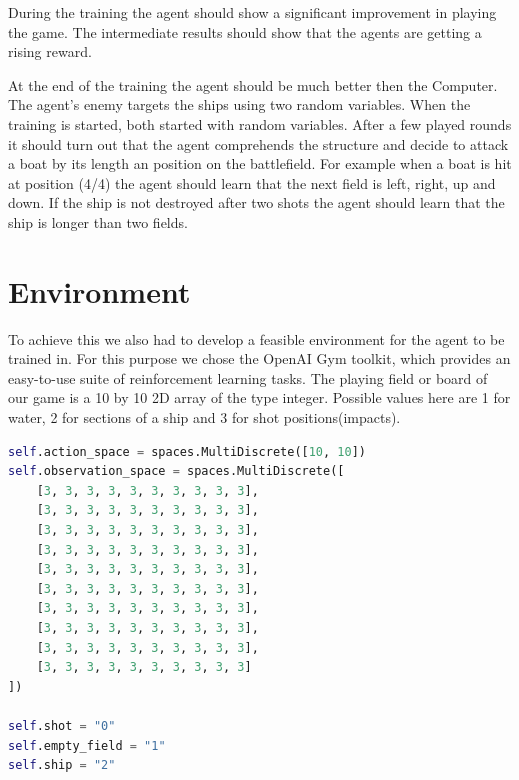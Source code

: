 \documentclass[sigconf]{acmart}
\begin{document}
During the training the agent should show a significant improvement in playing the game.
The intermediate results should show that the agents are getting a rising reward.

At the end of the training the agent should be much better then the Computer.
The agent's enemy targets the ships using two random variables.
When the training is started, both started with random variables.
After a few played rounds it should turn out that the agent comprehends the structure and decide to attack a boat by its length an position on the battlefield. 
For example when a boat is hit at position (4/4) the agent should learn that the next field is left, right, up and down.
If the ship is not destroyed after two shots the agent should learn that the ship is longer than two fields.

\section{Environment}
To achieve this we also had to develop a feasible environment for the agent to be trained in. For this purpose we chose the OpenAI Gym toolkit, which provides an easy-to-use suite of reinforcement learning tasks.
The playing field or board of our game is a 10 by 10 2D array of the type integer. Possible values here are 1 for water, 2 for sections of a ship and 3 for shot positions(impacts).

\vspace{2.5mm} %
\begin{lstlisting}[language=Python, caption=action\_space and observation\_space]
self.action_space = spaces.MultiDiscrete([10, 10])
self.observation_space = spaces.MultiDiscrete([
	[3, 3, 3, 3, 3, 3, 3, 3, 3, 3],
	[3, 3, 3, 3, 3, 3, 3, 3, 3, 3],
	[3, 3, 3, 3, 3, 3, 3, 3, 3, 3],
	[3, 3, 3, 3, 3, 3, 3, 3, 3, 3],
	[3, 3, 3, 3, 3, 3, 3, 3, 3, 3],
	[3, 3, 3, 3, 3, 3, 3, 3, 3, 3],
	[3, 3, 3, 3, 3, 3, 3, 3, 3, 3],
	[3, 3, 3, 3, 3, 3, 3, 3, 3, 3],
	[3, 3, 3, 3, 3, 3, 3, 3, 3, 3],
	[3, 3, 3, 3, 3, 3, 3, 3, 3, 3]
])

self.shot = "0"
self.empty_field = "1"
self.ship = "2"

    
\end{lstlisting}

\vspace{2.5mm}

\end{document}

